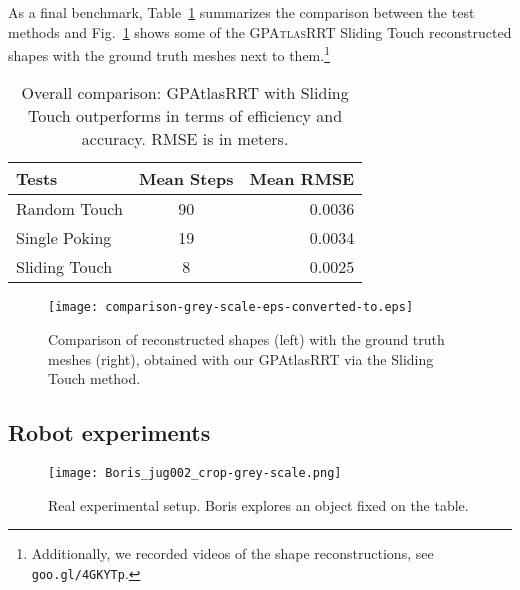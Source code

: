  As a final benchmark, Table~\ref{tab:comp} summarizes the comparison
between the test methods and Fig.~\ref{fig:shapecomp} shows some  of the \textsc{GPAtlasRRT} Sliding Touch reconstructed shapes with
the ground truth meshes next to them.\footnote{Additionally, we recorded videos of the shape reconstructions, see \texttt{goo.gl/4GKYTp}.}
\begin{table}
    \centering
    \begin{tabular}{|l|c|r|}
        \hline
        Tests  & Mean Steps & Mean RMSE \\
        \hline
        Random Touch & 90 & 0.0036\\
        Single Poking &19 & 0.0034\\
        Sliding Touch &8 & 0.0025\\
        \hline
    \end{tabular}
    \caption{Overall comparison: GPAtlasRRT with Sliding Touch outperforms in terms
    of efficiency and accuracy. RMSE is in meters.}
    \label{tab:comp}
\end{table}

\begin{figure}[htb]
    \centering
    \texttt{[image: comparison-grey-scale-eps-converted-to.eps]}
    \caption{Comparison of reconstructed shapes (left) with the ground truth meshes (right), obtained with our GPAtlasRRT via the Sliding Touch method.}
    \label{fig:shapecomp}
\end{figure}


\subsection{Robot experiments}
\label{sec:vito}

\begin{figure}[htb]
    \centering
    \texttt{[image: Boris\_jug002\_crop-grey-scale.png]}
    \caption{Real experimental setup. Boris explores an object fixed on the table.}
    \label{fig:boris}
\end{figure}

